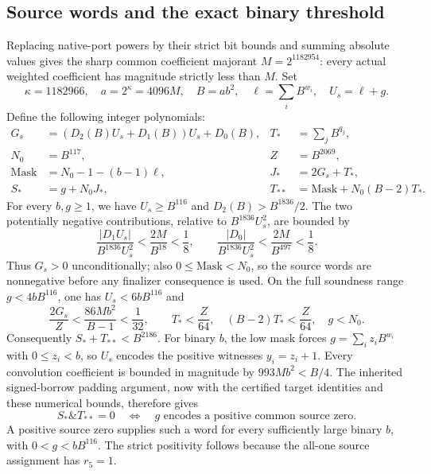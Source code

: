\subsection{Source words and the exact binary threshold}

Replacing native-port powers by their strict bit bounds and summing
absolute values gives the sharp common coefficient majorant
$M=2^{1182954}$: every actual weighted coefficient has magnitude strictly
less than $M$.  Set
\[
 \kappa=1182966,\quad a=2^\kappa=4096M,\quad B=ab^2,
 \quad \ell=\sum_iB^{w_i},\quad U_s=\ell+g.
\]
Define the following integer polynomials:
\[
\begin{aligned}
 G_s&=(D_2(B)U_s+D_1(B))U_s+D_0(B),&
 T_*&=\sum_jB^{q_j},\\
 N_0&=B^{117},&Z&=B^{2069},\\
 \mathrm{Mask}&=N_0-1-(b-1)\ell,&
 J_*&=2G_s+T_*,\\
 S_*&=g+N_0J_*,&
 T_{**}&=\mathrm{Mask}+N_0(B-2)T_*.
\end{aligned}
\]
For every $b,g\ge1$, we have $U_s\ge B^{116}$ and
$D_2(B)>B^{1836}/2$.  The two potentially negative contributions, relative
to $B^{1836}U_s^2$, are bounded by
\[
 \frac{|D_1U_s|}{B^{1836}U_s^2}<\frac{2M}{B^{18}}<\frac18,
 \qquad
 \frac{|D_0|}{B^{1836}U_s^2}<\frac{2M}{B^{497}}<\frac18.
\]
Thus $G_s>0$ unconditionally; also $0\le\mathrm{Mask}<N_0$, so the source
words are nonnegative before any finalizer consequence is used.
On the full soundness range $g<4bB^{116}$, one has $U_s<6bB^{116}$ and
\[
 \frac{2G_s}{Z}<\frac{86Mb^2}{B-1}<\frac1{32},\qquad
 T_*<\frac Z{64},\quad(B-2)T_*<\frac Z{64},\quad g<N_0.
\]
Consequently $S_*+T_{**}<B^{2186}$.  For binary $b$, the low mask forces
$g=\sum_i z_iB^{w_i}$ with $0\le z_i<b$, so $U_s$ encodes the positive
witnesses $y_i=z_i+1$.  Every convolution coefficient is bounded in
magnitude by $993Mb^2<B/4$.  The inherited signed-borrow padding argument,
now with the certified target identities and these numerical bounds,
therefore gives
\[
 S_*\mathbin{\&}T_{**}=0
 \quad\Longleftrightarrow\quad
 g\text{ encodes a positive common source zero}.
\]
A positive source zero supplies such a word for every sufficiently large
binary $b$, with $0<g<bB^{116}$.  The strict positivity follows because
the all-one source assignment has $r_5=1$.


